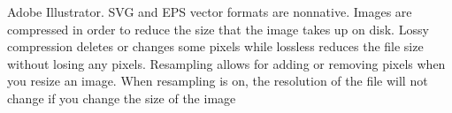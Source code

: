 \documentclass{report}
\begin{document}
    Adobe Illustrator. SVG and EPS vector formats are nonnative. 
    \bigbreak \noindent 
    \noindent Images are compressed in order to reduce the size that the image takes up on disk.
    \bigbreak \noindent 
    \noindent Lossy compression deletes or changes some pixels while lossless reduces the file size
    without losing any pixels.
    \bigbreak \noindent 
    \noindent Resampling allows for adding or removing pixels when you resize an image. 
    When resampling is on, the resolution of the file will not change if you change the 
    size of the image
\end{document}
